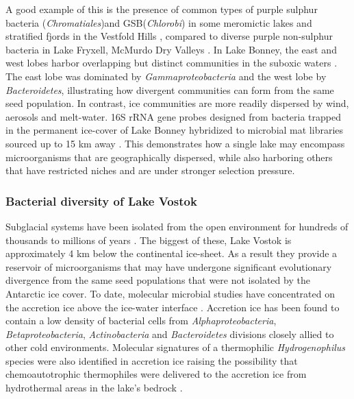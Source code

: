 A good example of this is the presence of common types of purple sulphur bacteria (\emph{Chromatiales})and \ac{GSB}(\emph{Chlorobi}) in some meromictic lakes and stratified fjords in the Vestfold Hills \cite{Burke1988}, compared to diverse purple non-sulphur bacteria in Lake Fryxell, McMurdo Dry Valleys \cite{Karr2003}. 
In Lake Bonney, the east and west lobes harbor overlapping but distinct communities in the suboxic waters \cite{Glatz2006}.
The east lobe was dominated by \emph{Gammaproteobacteria} and the west lobe by \emph{Bacteroidetes}, illustrating how divergent communities can form from the same seed population. 
In contrast, ice communities are more readily dispersed by wind, aerosols and melt-water. 
16S \ac{rRNA} gene probes designed from bacteria trapped in the permanent ice-cover of Lake Bonney hybridized to microbial mat libraries sourced up to 15 km away \cite{Gordon2000}.
This demonstrates how a single lake may encompass microorganisms that are geographically dispersed, while also harboring others that have restricted niches and are under stronger selection pressure.

\subsubsection{Bacterial diversity of Lake Vostok}
Subglacial systems have been isolated from the open environment for hundreds of thousands to millions of years \cite{Siegert2001}.
The biggest of these, Lake Vostok is approximately 4 km below the continental ice-sheet.
As a result they provide a reservoir of microorganisms that may have undergone significant evolutionary divergence from the same seed populations that were not isolated by the Antarctic ice cover. 
To date, molecular microbial studies have concentrated on the accretion ice above the ice-water interface \cite{Priscu1999, Christner2001}.
Accretion ice has been found to contain a low density of bacterial cells from \emph{Alphaproteobacteria}, \emph{Betaproteobacteria}, \emph{Actinobacteria} and \emph{Bacteroidetes} divisions closely allied to other cold environments.
Molecular signatures of a thermophilic \emph{Hydrogenophilus} species were also identified in accretion ice 
raising the possibility that chemoautotrophic thermophiles were delivered to the accretion ice from hydrothermal areas in the lake’s bedrock \cite{Bulat2004, Lavire2006}.

